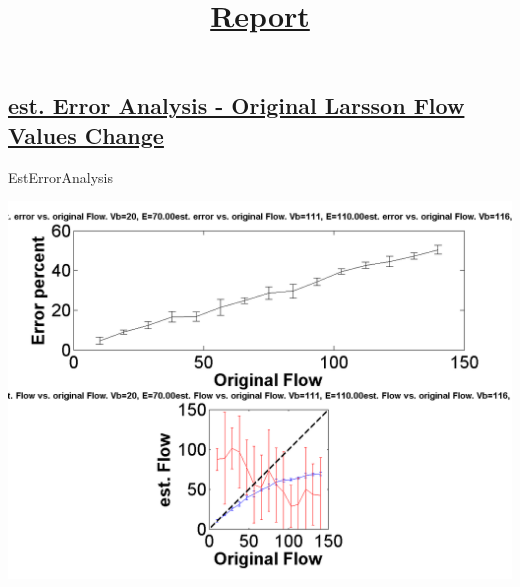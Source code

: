 \documentclass[english]{article}
\begin{document}
\graphicspath{ {\\fmri-guy2\Dropbox\University\Msc\Thesis\General\Matlab Simulations\Flow Extraction\Latest Code\Run_Output\ } }
\title{\underline{Report}}
\maketitle


\subsection*{\underline{est. Error Analysis - Original Larsson Flow Values Change}}

EstErrorAnalysis




\includegraphics[scale=0.7]{Est_Error_Analysis_Larsson_F.png}
\end{document}
